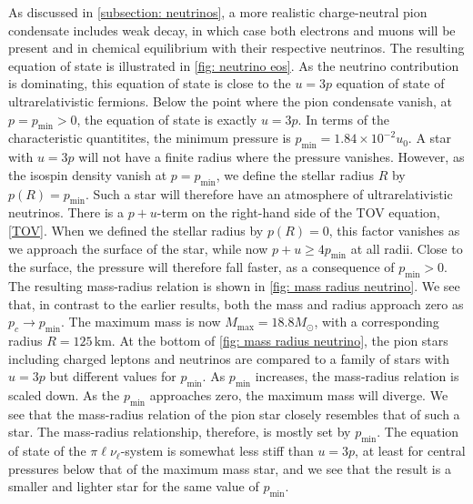 As discussed in \autoref{subsection: neutrinos}, a more realistic charge-neutral pion condensate includes weak decay, in which case both electrons and muons will be present and in chemical equilibrium with their respective neutrinos.
The resulting equation of state is illustrated in \autoref{fig: neutrino eos}.
As the neutrino contribution is dominating, this equation of state is close to the $u = 3p$ equation of state of ultrarelativistic fermions.
Below the point where the pion condensate vanish, at $p = p_\text{min}>0$, the equation of state is exactly $u = 3p$.
In terms of the characteristic quantitites, the minimum pressure is $p_\text{min} = 1.84 \times 10^{-2} u_0$.
A star with $u = 3p$ will not have a finite radius where the pressure vanishes.
However, as the isospin density vanish at $p = p_\text{min}$, we define the stellar radius $R$ by $p(R) = p_\text{min}$.
Such a star will therefore have an atmosphere of ultrarelativistic neutrinos.
There is a $p+u$-term on the right-hand side of the TOV equation, \autoref{TOV}.
When we defined the stellar radius by $p(R) = 0$, this factor vanishes as we approach the surface of the star, while now $p+u \geq 4 p_\text{min}$ at all radii.
Close to the surface, the pressure will therefore fall faster, as a consequence of $p_\text{min}>0$.
The resulting mass-radius relation is shown in \autoref{fig: mass radius neutrino}.
We see that, in contrast to the earlier results, both the mass and radius approach zero as $p_c \rightarrow p_\text{min}$.
The maximum mass is now $M_\text{max} = 18.8 M_\odot$, with a corresponding radius $R = 125 \, \text{km}$.
At the bottom of \autoref{fig: mass radius neutrino}, the pion stars including charged leptons and neutrinos are compared to a family of stars with $u = 3p$ but different values for $p_\text{min}$.
As $p_\text{min}$ increases, the mass-radius relation is scaled down.
As the $p_\text{min}$ approaches zero, the maximum mass will diverge.
We see that the mass-radius relation of the pion star closely resembles that of such a star.
The mass-radius relationship, therefore, is mostly set by $p_\text{min}$.
The equation of state of the $\pi\ell\nu_\ell$-system is somewhat less stiff than $u = 3p$, at least for central pressures below that of the maximum mass star, and we see that the result is a smaller and lighter star for the same value of $p_\text{min}$.

